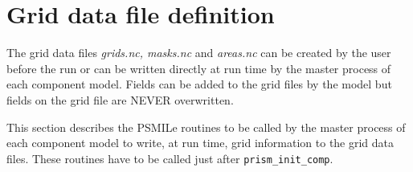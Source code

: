 \section{Grid data file definition}
\label{subsubsec_griddef}

The grid data files {\em grids.nc, masks.nc} and {\em areas.nc} can be
created by the user before the run or can be written directly at run
time by the master process of each component model.  Fields can be
added to the grid files by the model but fields on the grid file
are NEVER overwritten.



This section describes the PSMILe routines to be called by the
master process of each component model to write, at run time,
grid information to the grid data files. These routines have to
be called just after {\tt prism\_init\_comp}.

